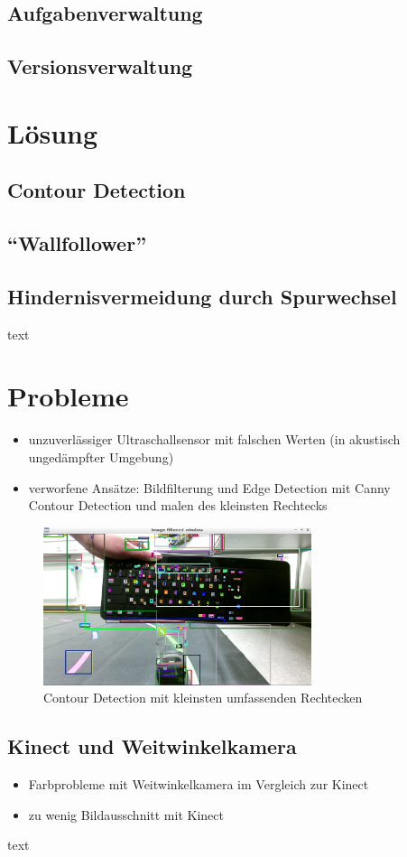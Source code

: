 \section{Aufgabenverwaltung}
\label{sec:aufgabenverwaltung}
\section{Versionsverwaltung}
\label{sec:versionsverwaltung}


\chapter{Lösung}
\label{cha:loesung}
\section{Contour Detection}
\label{sec:contourDetection}
\section{\textquotedblleft Wallfollower\textquotedblright}
\label{sec:wallfollower}
\section{Hindernisvermeidung durch Spurwechsel}
\label{sec:spurwechsel}
text


\chapter{Probleme}
\label{cha:probleme}
\begin{itemize}
	\item unzuverlässiger Ultraschallsensor mit falschen Werten (in akustisch ungedämpfter Umgebung)
	\item verworfene Ansätze: Bildfilterung und Edge Detection mit Canny\\
	Contour Detection und malen des kleinsten Rechtecks
\end{itemize}
\begin{figure}[h]
	\label{fig:rechtecke}
	\centering
	\includegraphics[width=0.7\textwidth]{images/rechtecke.png}
	\caption{Contour Detection mit kleinsten umfassenden Rechtecken}
\end{figure}
\section{Kinect und Weitwinkelkamera}
\label{sec:kinectWeitwinkel}
\begin{itemize}
	\item Farbprobleme mit Weitwinkelkamera im Vergleich zur Kinect
	\item zu wenig Bildausschnitt mit Kinect
\end{itemize}
text

